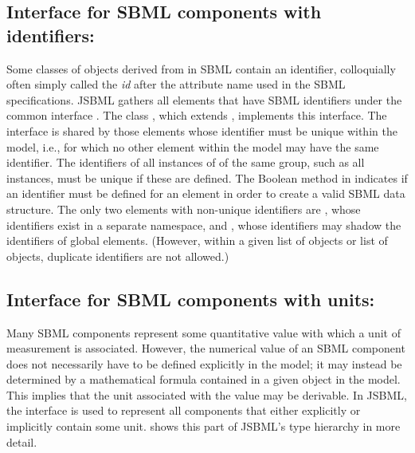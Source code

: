 \subsection{Interface for SBML components with identifiers: }

Some classes of objects derived from \SBase in SBML contain an identifier,
colloquially often simply called the \emph{id} after the attribute name used
in the SBML specifications. JSBML gathers all elements that have SBML
identifiers under the common interface \NamedSBase. The class
\AbstractNamedSBase, which extends \AbstractSBase, implements this interface.
The interface \UniqueNamedSBase is shared by those elements whose identifier
must be unique within the model, i.e., for which no other element within the
model may have the same identifier. The identifiers of all instances of
\UniqueNamedSBase of the same group, such as all \UnitDefinition instances,
must be unique if these are defined. The Boolean method
 in \NamedSBase indicates if an identifier must be
defined for an element in order to create a valid SBML data structure. The
only two elements with non-unique identifiers are \UnitDefinition, whose
identifiers exist in a separate namespace, and \LocalParameter, whose
identifiers may shadow the identifiers of global elements. (However, within a
given list of \UnitDefinition objects or list of \LocalParameter objects,
duplicate identifiers are not allowed.)


\subsection{Interface for SBML components with units: }

Many SBML components represent some quantitative value with which a unit of
measurement is associated. However, the numerical value of an SBML
component does not necessarily have to be defined explicitly in the model;
it may instead be determined by a mathematical formula contained in a given
\SBase object in the model.  This implies that the unit associated with the
value may be derivable.  In JSBML, the interface \SBaseWithDerivedUnit is
used to represent all components that either explicitly or implicitly
contain some unit.   shows this part of JSBML's
type hierarchy in more detail.

